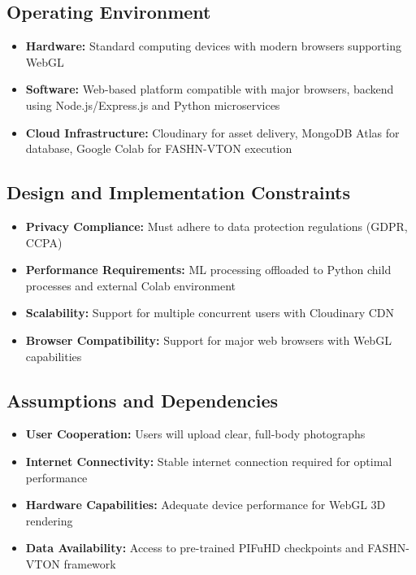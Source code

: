 \documentclass[12pt,a4paper,oneside]{report}
\begin{document}
\subsection{Operating Environment}
\begin{itemize}
    \item \textbf{Hardware:} Standard computing devices with modern browsers supporting WebGL
    \item \textbf{Software:} Web-based platform compatible with major browsers, backend using Node.js/Express.js and Python microservices \cite{19}
    \item \textbf{Cloud Infrastructure:} Cloudinary for asset delivery, MongoDB Atlas for database, Google Colab for FASHN-VTON execution \cite{16}

\end{itemize}

\subsection{Design and Implementation Constraints}
\begin{itemize}
    \item \textbf{Privacy Compliance:} Must adhere to data protection regulations (GDPR, CCPA)
    \item \textbf{Performance Requirements:} ML processing offloaded to Python child processes and external Colab environment
    \item \textbf{Scalability:} Support for multiple concurrent users with Cloudinary CDN
    \item \textbf{Browser Compatibility:} Support for major web browsers with WebGL capabilities
\end{itemize}

\subsection{Assumptions and Dependencies}
\begin{itemize}
    \item \textbf{User Cooperation:} Users will upload clear, full-body photographs
    \item \textbf{Internet Connectivity:} Stable internet connection required for optimal performance
    \item \textbf{Hardware Capabilities:} Adequate device performance for WebGL 3D rendering \cite{6}
    \item \textbf{Data Availability:} Access to pre-trained PIFuHD checkpoints \cite{1} and FASHN-VTON framework \cite{16}
\end{itemize}
\end{document}
